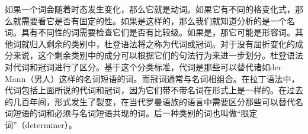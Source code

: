 如果一个词会随着时态发生变化，那么它就是动词。如果它有不同的格变化式，那么就需要看它是否有固定的性。如果是这样的，那么我们就知道分析的是一个名词。具有不同性的词需要检查它们是否有比较级。如果是，那它可能是形容词。其他词就归入剩余的类别中，杜登语法将之称为代词或冠词。对于没有屈折变化的成分来说，这个剩余类别中的成分可以根据它们的句法行为来进一步划分。杜登语法对代词和冠词进行了区分。基于这个分类标准，代词是那些可以替代诸如der
Mann（男人）这样的名词短语的词。而冠词通常与名词相组合。在拉丁语法中，代词包括上面所说的代词和冠词，因为它们带不带名词在形式上是一样的。在过去的几百年间，形式发生了裂变，在当代罗曼语族的语言中需要区分那些可以替代名词短语的词和必须与名词短语共现的词。后一种类别的词也叫做“限定词”（determiner）。

